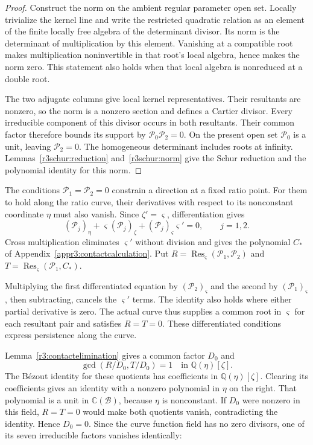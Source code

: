 \documentclass[11pt,a4paper]{article}
\numberwithin{equation}{section}
\theoremstyle{plain}
\theoremstyle{definition}
\theoremstyle{remark}
\begin{document}
\begin{proof}
Construct the norm on the ambient regular parameter open set.
Locally trivialize the kernel line and write the restricted
quadratic relation as an element of the finite locally free
algebra of the determinant divisor. Its norm is the determinant
of multiplication by this element. Vanishing at a compatible
root makes multiplication noninvertible in that root's local
algebra, hence makes the norm zero. This statement also holds
when that local algebra is nonreduced at a double root.

The two adjugate columns give local kernel representatives.
Their resultants are nonzero, so the norm is a nonzero section
and defines a Cartier divisor. Every irreducible component of
this divisor occurs in both resultants. Their common factor
therefore bounds its support by
$\mathcal P_0\mathcal P_2=0$. On the present open set
$\mathcal P_0$ is a unit, leaving $\mathcal P_2=0$.
The homogeneous determinant includes roots at infinity.
Lemmas~\ref{r3schur:reduction} and~\ref{r3schur:norm} give the
Schur reduction and the polynomial identity for this norm.
\end{proof}

The conditions $\mathcal P_1=\mathcal P_2=0$ constrain a direction
at a fixed ratio point. For them to hold along the ratio curve,
their derivatives with respect to its nonconstant coordinate
$\eta$ must also vanish. Since $\zeta'=\varsigma$, differentiation gives
\begin{equation}\label{r3:curve-differentiation}
 (\mathcal P_j)_\eta+\varsigma(\mathcal P_j)_\zeta
       +(\mathcal P_j)_\varsigma\varsigma'=0,
       \qquad j=1,2.
\end{equation}
Cross multiplication eliminates $\varsigma'$ without division
and gives the polynomial $C_*$ of
Appendix~\ref{appr3:contactcalculation}. Put
$R=\operatorname{Res}_\varsigma(\mathcal P_1,\mathcal P_2)$ and
$T=\operatorname{Res}_\varsigma(\mathcal P_1,C_*)$.

Multiplying the first differentiated equation by
$(\mathcal P_2)_\varsigma$ and the second by
$(\mathcal P_1)_\varsigma$, then subtracting, cancels the
$\varsigma'$ terms. The identity also holds where either partial
derivative is zero. The actual curve thus supplies a common
root in $\varsigma$ for each resultant pair and satisfies
$R=T=0$. These differentiated conditions express persistence
along the curve.

Lemma~\ref{r3:contactelimination} gives a common factor $D_0$ and
\[
 \gcd(R/D_0,T/D_0)=1\quad\text{in }\mathbb Q(\eta)[\zeta].
\]
The B\'ezout identity for these quotients has coefficients in
$\mathbb Q(\eta)[\zeta]$. Clearing its coefficients gives an
identity with a nonzero polynomial in $\eta$ on the right.
That polynomial is a unit in $\mathbb C(\mathscr B)$, because
$\eta$ is nonconstant. If $D_0$ were nonzero in this field,
$R=T=0$ would make both quotients vanish, contradicting the
identity. Hence $D_0=0$. Since the curve function field has
no zero divisors, one of its seven irreducible factors vanishes
identically:
\end{document}
